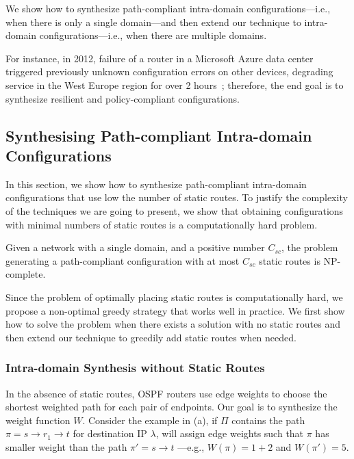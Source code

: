 We show how to synthesize  path-compliant  intra-domain configurations---i.e., when there
is only a single domain---and then extend our technique to
 intra-domain configurations---i.e., when
there are multiple domains.

For instance, in 2012,
failure of a router in a Microsoft Azure data center 
triggered previously unknown configuration errors on other 
devices, degrading service 
in the West Europe region for over 2
hours~\cite{azure}; therefore, the end goal is 
to synthesize resilient and policy-compliant 
configurations. 





\subsection{Synthesising Path-compliant Intra-domain Configurations} \label{sec:intra-synthesis}
In this section, we show how to synthesize  path-compliant  intra-domain configurations that
use low the number of static routes.
To justify the complexity of the techniques we are going to present,
we show that
obtaining configurations with minimal numbers of static routes is a 
computationally hard problem.
\begin{theorem}
\label{thm:ospfsynth}
Given a
network with a single domain,
and a positive number $C_{sc}$,
the problem generating
a path-compliant configuration with at most $C_{sc}$ static routes
is NP-complete.
\end{theorem}
\iffull

\fi
Since the problem of optimally placing static routes is computationally hard, 
we propose a non-optimal greedy strategy that works well in practice.
We first show how to solve the problem when there exists a solution with no static routes
and then extend our technique to greedily add static routes when needed.
			
\subsubsection{Intra-domain Synthesis without Static Routes} \label{sec:ospf}
 
In the absence of static routes,
 OSPF routers use edge weights
 to choose the
 shortest weighted path for each pair of endpoints. 
Our goal is to synthesize the weight function $W$.
Consider the example in (a), if $\Pi$ 
 contains the 
 path $\pi=s\rightarrow r_1 \rightarrow t$ for
 destination IP $\lambda$, \name will assign
 edge weights such that $\pi$ has
 smaller weight than the path $\pi'=s \rightarrow t$ ---e.g., $W(\pi)=1+2$
  and $W(\pi')=5$. 
 

